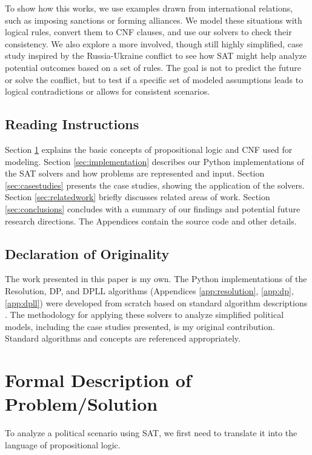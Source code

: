 \documentclass[11pt, a4paper]{article}
\begin{document}
To show how this works, we use examples drawn from international relations, such as imposing sanctions or forming alliances. We model these situations with logical rules, convert them to CNF clauses, and use our solvers to check their consistency. We also explore a more involved, though still highly simplified, case study inspired by the Russia-Ukraine conflict to see how SAT might help analyze potential outcomes based on a set of rules. The goal is not to predict the future or solve the conflict, but to test if a specific set of modeled assumptions leads to logical contradictions or allows for consistent scenarios.

\subsection*{Reading Instructions}
Section \ref{sec:formal} explains the basic concepts of propositional logic and CNF used for modeling. Section \ref{sec:implementation} describes our Python implementations of the SAT solvers and how problems are represented and input. Section \ref{sec:casestudies} presents the case studies, showing the application of the solvers. Section \ref{sec:relatedwork} briefly discusses related areas of work. Section \ref{sec:conclusions} concludes with a summary of our findings and potential future research directions. The Appendices contain the source code and other details.

\subsection*{Declaration of Originality}
The work presented in this paper is my own. The Python implementations of the Resolution, DP, and DPLL algorithms (Appendices \ref{app:resolution}, \ref{app:dp}, \ref{app:dpll}) were developed from scratch based on standard algorithm descriptions \cite{Robinson1965, DavisPutnam1960, DPLL1962}. The methodology for applying these solvers to analyze simplified political models, including the case studies presented, is my original contribution. Standard algorithms and concepts are referenced appropriately.


\section{Formal Description of Problem/Solution} \label{sec:formal}

To analyze a political scenario using SAT, we first need to translate it into the language of propositional logic.
\end{document}
